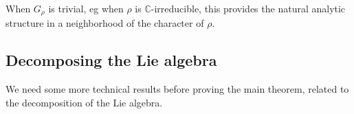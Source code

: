\documentclass[a4paper,11pt]{article}
\newtheorem{Lemma}[Theorem]{Lemma}
\newtheorem{Remark}[Theorem]{Remark}
\begin{document}
When $G_\rho$ is trivial, eg when $\rho$ is $\mathbb{C}$-irreducible, this provides the natural analytic structure in a neighborhood of the character of $\rho$.

% 
% 
% 
%  



\subsection{Decomposing the Lie algebra}
\label{Section:Decomposition}

We need some more technical results before proving the main theorem, related to the decomposition of the Lie algebra.
\end{document}
